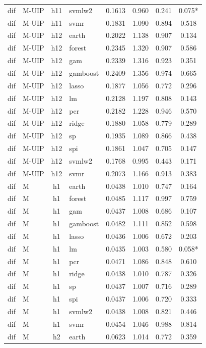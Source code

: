 \begin{ThreePartTable}
\begin{longtable}[t]{llclcccc}
dif & M-UIP & h11 & svmlw2 & 0.1613 & 0.960 & 0.241 & 0.075*\\
dif & M-UIP & h11 & svmr & 0.1831 & 1.090 & 0.894 & 0.518\\
\addlinespace
dif & M-UIP & h12 & earth & 0.2022 & 1.138 & 0.907 & 0.134\\
dif & M-UIP & h12 & forest & 0.2345 & 1.320 & 0.907 & 0.586\\
dif & M-UIP & h12 & gam & 0.2339 & 1.316 & 0.923 & 0.351\\
dif & M-UIP & h12 & gamboost & 0.2409 & 1.356 & 0.974 & 0.665\\
dif & M-UIP & h12 & lasso & 0.1877 & 1.056 & 0.772 & 0.296\\
dif & M-UIP & h12 & lm & 0.2128 & 1.197 & 0.808 & 0.143\\
dif & M-UIP & h12 & pcr & 0.2182 & 1.228 & 0.946 & 0.570\\
dif & M-UIP & h12 & ridge & 0.1880 & 1.058 & 0.779 & 0.289\\
dif & M-UIP & h12 & sp & 0.1935 & 1.089 & 0.866 & 0.438\\
dif & M-UIP & h12 & spi & 0.1861 & 1.047 & 0.705 & 0.147\\
dif & M-UIP & h12 & svmlw2 & 0.1768 & 0.995 & 0.443 & 0.171\\
dif & M-UIP & h12 & svmr & 0.2073 & 1.166 & 0.913 & 0.383\\
\addlinespace
dif & M & h1 & earth & 0.0438 & 1.010 & 0.747 & 0.164\\
dif & M & h1 & forest & 0.0485 & 1.117 & 0.997 & 0.759\\
dif & M & h1 & gam & 0.0437 & 1.008 & 0.686 & 0.107\\
dif & M & h1 & gamboost & 0.0482 & 1.111 & 0.852 & 0.598\\
dif & M & h1 & lasso & 0.0436 & 1.006 & 0.672 & 0.203\\
dif & M & h1 & lm & 0.0435 & 1.003 & 0.580 & 0.058*\\
dif & M & h1 & pcr & 0.0471 & 1.086 & 0.848 & 0.610\\
dif & M & h1 & ridge & 0.0438 & 1.010 & 0.787 & 0.326\\
dif & M & h1 & sp & 0.0437 & 1.007 & 0.716 & 0.289\\
dif & M & h1 & spi & 0.0437 & 1.006 & 0.720 & 0.333\\
dif & M & h1 & svmlw2 & 0.0438 & 1.008 & 0.821 & 0.446\\
dif & M & h1 & svmr & 0.0454 & 1.046 & 0.988 & 0.814\\
\addlinespace
dif & M & h2 & earth & 0.0623 & 1.014 & 0.772 & 0.359\\

\end{longtable}
\end{ThreePartTable}
